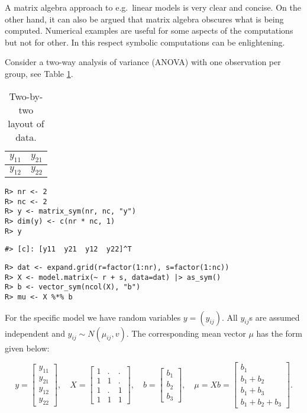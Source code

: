A matrix algebra approach to e.g.~linear models is very clear and
concise. On the other hand, it can also be argued that matrix algebra
obscures what is being computed. Numerical examples are useful for
some aspects of the computations but not for other. In this respect
symbolic computations can be enlightening.

Consider a two-way analysis of variance (ANOVA) with one observation
per group, see Table \ref{tab:anova-two-way-table}.

\begin{table}[!h]

\caption{\label{tab:anova-two-way-table}Two-by-two layout of data.}
\centering
\begin{tabular}[t]{|>{}l|>{}l|}
\hline
$y_{11}$ & $y_{21}$\\
\hline
$y_{12}$ & $y_{22}$\\
\hline
\end{tabular}
\end{table}

\begin{verbatim}
R> nr <- 2
R> nc <- 2
R> y <- matrix_sym(nr, nc, "y")
R> dim(y) <- c(nr * nc, 1)
R> y
\end{verbatim}

\begin{verbatim}
#> [c]: [y11  y21  y12  y22]^T
\end{verbatim}

\begin{verbatim}
R> dat <- expand.grid(r=factor(1:nr), s=factor(1:nc))
R> X <- model.matrix(~ r + s, data=dat) |> as_sym()
R> b <- vector_sym(ncol(X), "b")
R> mu <- X %*% b
\end{verbatim}

For the specific model we have random variables \(y=(y_{ij})\). All
\(y_{ij}\)s are assumed independent and \(y_{ij}\sim N(\mu_{ij}, v)\).
The corresponding mean vector \(\mu\) has the form given below:

\[
y = \left[\begin{matrix}y_{11}\\y_{21}\\y_{12}\\y_{22}\end{matrix}\right], \quad X=\left[\begin{matrix}1 & . & .\\1 & 1 & .\\1 & . & 1\\1 & 1 & 1\end{matrix}\right], \quad b=\left[\begin{matrix}b_{1}\\b_{2}\\b_{3}\end{matrix}\right], \quad  \mu = X b = \left[\begin{matrix}b_{1}\\b_{1} + b_{2}\\b_{1} + b_{3}\\b_{1} + b_{2} + b_{3}\end{matrix}\right] .
\]


